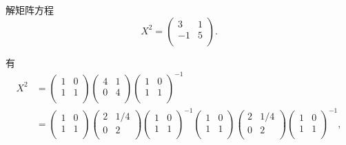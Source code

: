 \documentclass[color=black,device=normal,lang=cn,mode=geye]{elegantnote}
\begin{document}
\begin{exercisec}[2.5.18(1)]
    解矩阵方程
    \[X^2=\begin{pmatrix}
        3 & 1 \\
        -1 & 5 \\
    \end{pmatrix}.\]
\end{exercisec}
\begin{solution}
    有
    \begin{align*}
        X^2 & =\begin{pmatrix}
            1 & 0 \\
            1 & 1 \\
        \end{pmatrix}\begin{pmatrix}
            4 & 1 \\
            0 & 4 \\
        \end{pmatrix}\begin{pmatrix}
            1 & 0 \\
            1 & 1 \\
        \end{pmatrix}^{-1} \\
        & =\begin{pmatrix}
            1 & 0 \\
            1 & 1 \\
        \end{pmatrix}\begin{pmatrix}
            2 & 1/4 \\
            0 & 2 \\
        \end{pmatrix}\begin{pmatrix}
            1 & 0 \\
            1 & 1 \\
        \end{pmatrix}^{-1}\begin{pmatrix}
            1 & 0 \\
            1 & 1 \\
        \end{pmatrix}\begin{pmatrix}
            2 & 1/4 \\
            0 & 2 \\
        \end{pmatrix}\begin{pmatrix}
            1 & 0 \\
            1 & 1 \\
        \end{pmatrix}^{-1},
    \end{align*}


\end{solution}
\end{document}
